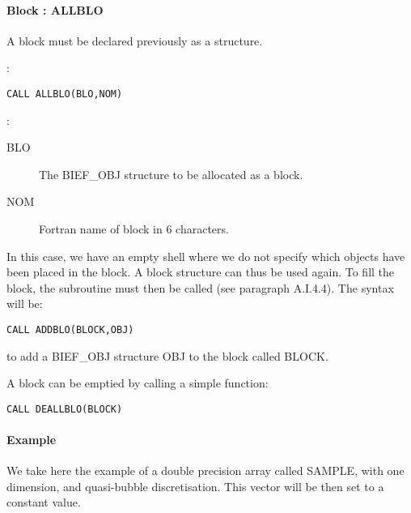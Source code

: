 \paragraph{Block : ALLBLO}

A block must be declared previously as a  structure.

:
\begin{lstlisting}[language=TelFortran]
CALL ALLBLO(BLO,NOM)
\end{lstlisting}

:
\begin{description}
  \item [BLO] The BIEF\_OBJ structure to be allocated as a block.
  \item [NOM] Fortran name of block in 6 characters.
\end{description}
In this case, we have an empty shell where we do not specify which objects have
been placed in the block. A block structure can thus be used again. To fill the
block, the subroutine  must then be called (see paragraph A.I.4.4).
The syntax will be:

\begin{lstlisting}[language=TelFortran]
CALL ADDBLO(BLOCK,OBJ)
\end{lstlisting}
to add a BIEF\_OBJ structure OBJ to the block called BLOCK.

A block can be emptied by calling a simple function:

\begin{lstlisting}[language=TelFortran]
CALL DEALLBLO(BLOCK)
\end{lstlisting}

\paragraph{Example}

We take here the example of a double precision array called SAMPLE, with one
dimension, and quasi-bubble discretisation. This vector will be then set to a
constant value.

